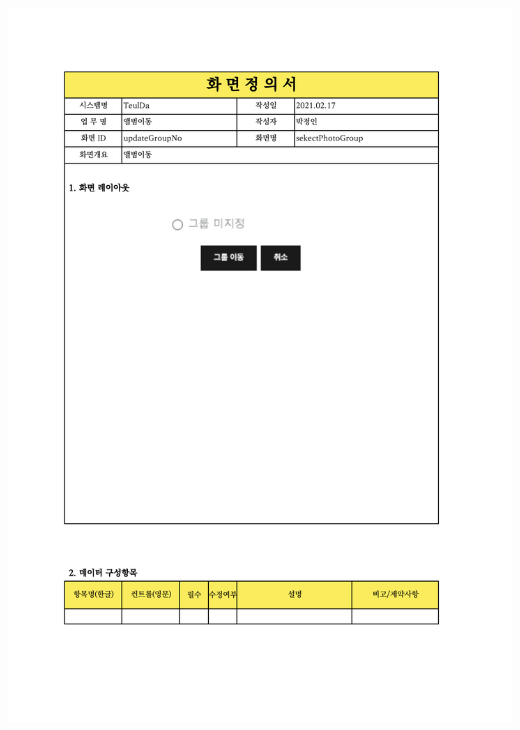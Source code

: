 {{{{{{{{{{{{{{{{{{{{{{{{{{{{{{{{{{{{{{{{{{{{{{{{{{{{\includegraphics[width=20cm]{./Figure/Design/Display/photo/photo_08.pdf} \\
}}}}}}}}}}}}}}}}}}}}}}}}}}}}}}}}}}}}}}}}}}}}}}}}}}}}
